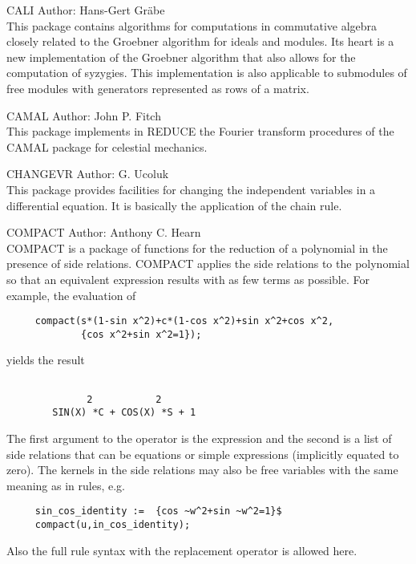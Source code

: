 \begin{Package}{CALI}
Author: Hans-Gert Gr{\"a}be \\

This package contains algorithms for computations in commutative algebra
closely related to the Groebner algorithm for ideals and modules.  Its
heart is a new implementation of the Groebner algorithm that also allows
for the computation of syzygies.  This implementation is also applicable to
submodules of free modules with generators represented as rows of a matrix.
\end{Package}

\begin{Package}{CAMAL}
Author: John P. Fitch\\

This package implements in REDUCE the Fourier transform procedures of the
CAMAL package for celestial mechanics.
\end{Package}

\begin{Package}{CHANGEVR}
Author: G. Ucoluk\\

This package provides facilities for changing the independent variables in
a differential equation. It is basically the application of the chain rule.
\end{Package}

\begin{Package}{COMPACT}
Author: Anthony C. Hearn\\

COMPACT is a package of functions for the reduction of a polynomial in the
presence of side relations.  COMPACT applies the side relations to the
polynomial so that an equivalent expression results with as few terms as
possible.  For example, the evaluation of

\begin{verbatim}
     compact(s*(1-sin x^2)+c*(1-cos x^2)+sin x^2+cos x^2,
             {cos x^2+sin x^2=1});

\end{verbatim}
yields the result
\begin{verbatim}

              2           2
        SIN(X) *C + COS(X) *S + 1
\end{verbatim}

The first argument to the operator  is the expression
and the second is a list of side relations that can be
equations or simple expressions (implicitly equated to zero). The
kernels in the side relations may also be free variables with the
same meaning as in rules, e.g.
\begin{verbatim}
     sin_cos_identity :=  {cos ~w^2+sin ~w^2=1}$
     compact(u,in_cos_identity);
\end{verbatim}
Also the full rule syntax with the replacement operator is allowed here.
\end{Package}                 

